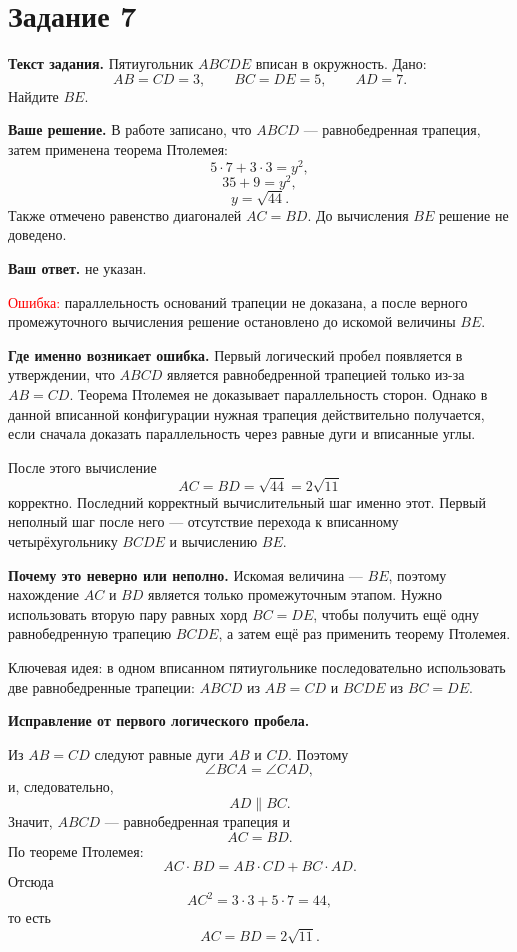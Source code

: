 \documentclass[12pt,a4paper]{article}
\newcommand{\errlabel}[1]{\textcolor{red}{Ошибка:} #1}
\newcommand{\keyidea}[1]{\textcolor{blue!60!black}{Ключевая идея:} #1}
\begin{document}
\newpage
{}\label{task:7}
\section*{Задание 7}

\textbf{Текст задания.} Пятиугольник $ABCDE$ вписан в окружность. Дано:
\[
AB=CD=3,\qquad BC=DE=5,\qquad AD=7.
\]
Найдите $BE$.

\textbf{Ваше решение.} В работе записано, что $ABCD$ --- равнобедренная трапеция, затем применена теорема Птолемея:
\[
5\cdot7+3\cdot3=y^2,
\]
\[
35+9=y^2,
\]
\[
y=\sqrt{44}.
\]
Также отмечено равенство диагоналей $AC=BD$. До вычисления $BE$ решение не доведено.

\textbf{Ваш ответ.} не указан.

\errlabel{параллельность оснований трапеции не доказана, а после верного промежуточного вычисления решение остановлено до искомой величины $BE$.}

\textbf{Где именно возникает ошибка.} Первый логический пробел появляется в утверждении, что $ABCD$ является равнобедренной трапецией только из-за $AB=CD$. Теорема Птолемея не доказывает параллельность сторон. Однако в данной вписанной конфигурации нужная трапеция действительно получается, если сначала доказать параллельность через равные дуги и вписанные углы.

После этого вычисление
\[
AC=BD=\sqrt{44}=2\sqrt{11}
\]
корректно. Последний корректный вычислительный шаг именно этот. Первый неполный шаг после него --- отсутствие перехода к вписанному четырёхугольнику $BCDE$ и вычислению $BE$.

\textbf{Почему это неверно или неполно.} Искомая величина --- $BE$, поэтому нахождение $AC$ и $BD$ является только промежуточным этапом. Нужно использовать вторую пару равных хорд $BC=DE$, чтобы получить ещё одну равнобедренную трапецию $BCDE$, а затем ещё раз применить теорему Птолемея.

\keyidea{в одном вписанном пятиугольнике последовательно использовать две равнобедренные трапеции: $ABCD$ из $AB=CD$ и $BCDE$ из $BC=DE$.}

\textbf{Исправление от первого логического пробела.}

Из $AB=CD$ следуют равные дуги $AB$ и $CD$. Поэтому
\[
\angle BCA=\angle CAD,
\]
и, следовательно,
\[
AD\parallel BC.
\]
Значит, $ABCD$ --- равнобедренная трапеция и
\[
AC=BD.
\]
По теореме Птолемея:
\[
AC\cdot BD=AB\cdot CD+BC\cdot AD.
\]
Отсюда
\[
AC^2=3\cdot3+5\cdot7=44,
\]
то есть
\[
AC=BD=2\sqrt{11}.
\]
\end{document}
